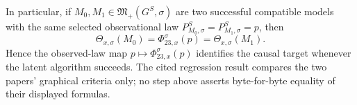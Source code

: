 In particular, if \(M_0,M_1\in\mathfrak M_+(G^S,\sigma)\) are two successful compatible models with the same selected observational law \(P_{M_0,\sigma}^S=P_{M_1,\sigma}^S=p\), then
\[
 \Theta_{x,\sigma}(M_0)
 =\Phi_{23,x}^{\sigma}(p)
 =\Theta_{x,\sigma}(M_1).
\]
Hence the observed-law map \(p\mapsto\Phi_{23,x}^{\sigma}(p)\) identifies the causal target whenever the latent algorithm succeeds.  The cited regression result compares the two papers' graphical criteria only; no step above asserts byte-for-byte equality of their displayed formulas.